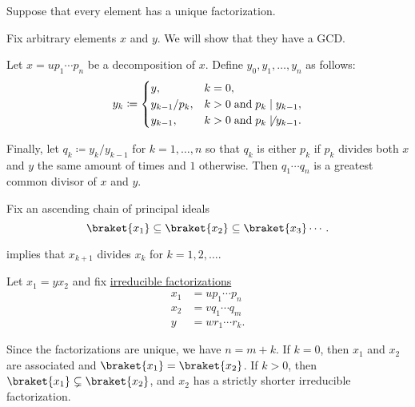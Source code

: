 \begin{defproof}
   Suppose that every element has a unique factorization.

   Fix arbitrary elements \( x \) and \( y \). We will show that they have a GCD.

  Let \( x = u p_1 \cdots p_n \) be a decomposition of \( x \). Define \( y_0, y_1, \ldots, y_n \) as follows:
  \begin{equation*}
    y_k \coloneqq \begin{cases}
      y,             &k = 0, \\
      y_{k-1} / p_k, &k > 0 \T{and} p_k \mid y_{k-1}, \\
      y_{k-1},       &k > 0 \T{and} p_k \not\mid y_{k-1}.
    \end{cases}
  \end{equation*}

  Finally, let \( q_k \coloneqq y_k / y_{k-1} \) for \( k = 1, \ldots, n \) so that \( q_k \) is either \( p_k \) if \( p_k \) divides both \( x \) and \( y \) the same amount of times and \( 1 \) otherwise. Then \( q_1 \cdots q_n \) is a greatest common divisor of \( x \) and \( y \).

   Fix an ascending chain of principal ideals
  \begin{equation*}
    \braket{ x_1 } \subseteq \braket{ x_2 } \subseteq \braket{ x_3 } \cdots.
  \end{equation*}

   implies that \( x_{k+1} \) divides \( x_k \) for \( k = 1, 2, \ldots \).

  Let \( x_1 = y x_2 \) and fix \hyperref[def:irreducible_factorization]{irreducible factorizations}
  \begin{align*}
    x_1 &= u p_1 \cdots p_n \\
    x_2 &= v q_1 \cdots q_m \\
    y   &= w r_1 \cdots r_k.
  \end{align*}

  Since the factorizations are unique, we have \( n = m + k \). If \( k = 0 \), then \( x_1 \) and \( x_2 \) are associated and \( \braket{ x_1 } = \braket{ x_2 } \). If \( k > 0 \), then \( \braket{ x_1 } \subsetneq \braket{ x_2 } \), and \( x_2 \) has a strictly shorter irreducible factorization.


\end{defproof}
